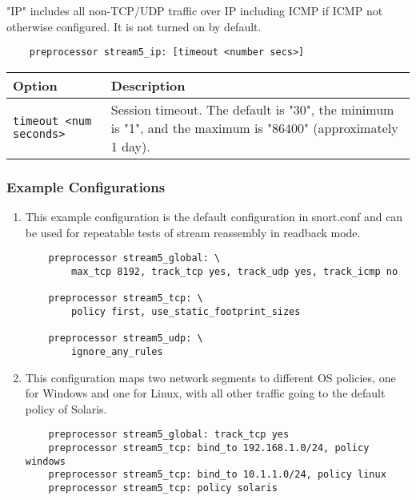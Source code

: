 \documentclass[english]{report}
\newenvironment{note}{
\samepage
    \vspace{10pt}{\textsf{
        {\hspace{7pt}\Huge{$\triangle$\hspace{-12.5pt}{\Large{$^!$}}}}\hspace{5pt}
        {\Large{NOTE}}
    }
    }
   \begin{center}
    \par\vspace{-17pt}

    \begin{lrbox}{\savepar}
    \begin{minipage}[r]{6in}
}
{
    \end{minipage}
    \end{lrbox}
    \fbox{
        \usebox{
            \savepar
	}
    }
    \par\vskip10pt
    \end{center}
}
\newenvironment{note}{
        \begin{rawhtml}
        <p><table border="1"><tr><td><b>
        Note:&nbsp;&nbsp;</b>
        \end{rawhtml}
}{
        \begin{rawhtml}
        </b></td></tr></table></p>
        \end{rawhtml}
}
\begin{document}
\begin{note}

"IP" includes all non-TCP/UDP traffic over IP including ICMP if ICMP
not otherwise configured.  It is not turned on by default.

\end{note}

\begin{verbatim}
    preprocessor stream5_ip: [timeout <number secs>]
\end{verbatim}

\begin{center}
\begin{tabular}{| l | p{4.5in} |}

\hline
\textbf{Option} & \textbf{Description}\\
\hline 

\hline 
\texttt{timeout <num seconds>} &

Session timeout.  The default is "30", the minimum is "1", and the maximum is
"86400" (approximately 1 day).\\

\hline
\end{tabular}
\end{center}

\subsubsection{Example Configurations}

\begin{enumerate}

\item{}

This example configuration is the default configuration in snort.conf and
can be used for repeatable tests of stream reassembly in readback mode.

\begin{verbatim}
    preprocessor stream5_global: \
        max_tcp 8192, track_tcp yes, track_udp yes, track_icmp no

    preprocessor stream5_tcp: \
        policy first, use_static_footprint_sizes

    preprocessor stream5_udp: \
        ignore_any_rules
\end{verbatim}

\item{}

This configuration maps two network segments to different OS policies, one for
Windows and one for Linux, with all other traffic going to the default policy
of Solaris.

\begin{verbatim}
    preprocessor stream5_global: track_tcp yes
    preprocessor stream5_tcp: bind_to 192.168.1.0/24, policy windows
    preprocessor stream5_tcp: bind_to 10.1.1.0/24, policy linux
    preprocessor stream5_tcp: policy solaris
\end{verbatim}

\end{enumerate}
\end{document}
